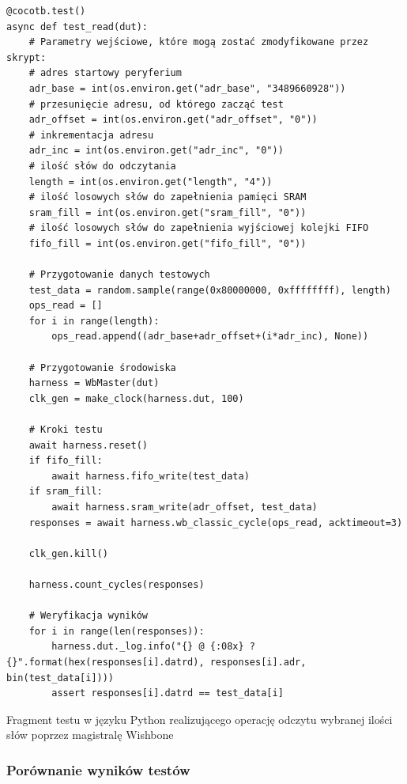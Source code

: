 \begin{longlisting}
\begin{verbatim}
@cocotb.test()
async def test_read(dut):
    # Parametry wejściowe, które mogą zostać zmodyfikowane przez skrypt:
    # adres startowy peryferium
    adr_base = int(os.environ.get("adr_base", "3489660928"))
    # przesunięcie adresu, od którego zacząć test
    adr_offset = int(os.environ.get("adr_offset", "0"))
    # inkrementacja adresu
    adr_inc = int(os.environ.get("adr_inc", "0"))
    # ilość słów do odczytania
    length = int(os.environ.get("length", "4"))
    # ilość losowych słów do zapełnienia pamięci SRAM
    sram_fill = int(os.environ.get("sram_fill", "0"))
    # ilość losowych słów do zapełnienia wyjściowej kolejki FIFO
    fifo_fill = int(os.environ.get("fifo_fill", "0"))

    # Przygotowanie danych testowych
    test_data = random.sample(range(0x80000000, 0xffffffff), length)
    ops_read = []
    for i in range(length):
        ops_read.append((adr_base+adr_offset+(i*adr_inc), None))

    # Przygotowanie środowiska
    harness = WbMaster(dut)
    clk_gen = make_clock(harness.dut, 100)

    # Kroki testu
    await harness.reset()
    if fifo_fill:
        await harness.fifo_write(test_data)
    if sram_fill:
        await harness.sram_write(adr_offset, test_data)
    responses = await harness.wb_classic_cycle(ops_read, acktimeout=3)

    clk_gen.kill()

    harness.count_cycles(responses)

    # Weryfikacja wyników
    for i in range(len(responses)):
        harness.dut._log.info("{} @ {:08x} ? {}".format(hex(responses[i].datrd), responses[i].adr, bin(test_data[i])))
        assert responses[i].datrd == test_data[i]
\end{verbatim}
\caption{\label{lst:harness-sampletest}Fragment testu w języku Python realizującego operację odczytu wybranej ilości słów poprzez magistralę Wishbone}
\end{longlisting}

\subsubsection{Porównanie wyników testów}

